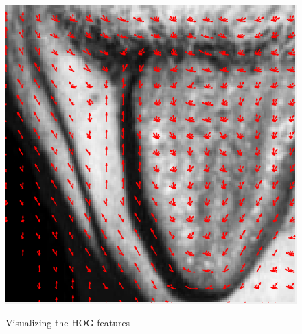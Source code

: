 \documentclass[letter, 11pt]{article}
\begin{document}
\begin{figure}[!htb]
  \label{fig:HOG EYE IMAGE}
\endminipage\hfill
{}
  \includegraphics[width=\linewidth]{HW1/RESULT/HOG_TONGUE.png}
  \label{fig:HOG TONGUE IMAGE}
\endminipage\hfill

\caption{Visualizing the HOG features}
\label{fig:fig}
\end{figure}
\end{document}
